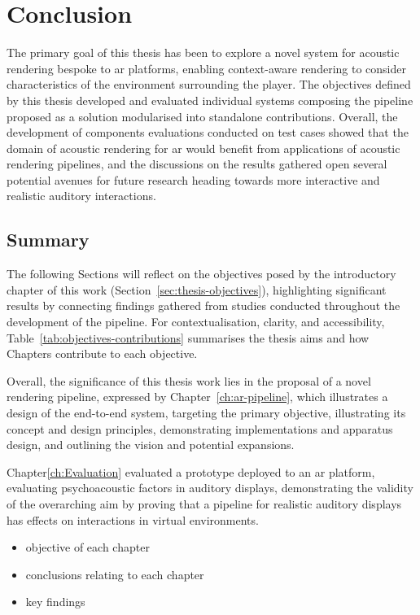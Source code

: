 \chapter{Conclusion}\label{ch:Conclusion}
The primary goal of this thesis has been to explore a novel system for acoustic rendering bespoke to \acrshort{ar} platforms, enabling context-aware rendering to consider characteristics of the environment surrounding the player. The objectives defined by this thesis developed and evaluated individual systems composing the pipeline proposed as a solution modularised into standalone contributions. Overall, the development of components evaluations conducted on test cases showed that the domain of acoustic rendering for \acrshort{ar} would benefit from applications of acoustic rendering pipelines, and the discussions on the results gathered open several potential avenues for future research heading towards more interactive and realistic auditory interactions.

\section{Summary}
The following Sections will reflect on the objectives posed by the introductory chapter of this work (Section~\ref{sec:thesis-objectives}), highlighting significant results by connecting findings gathered from studies conducted throughout the development of the pipeline. For contextualisation, clarity, and accessibility, Table~\ref{tab:objectives-contributions} summarises the thesis aims and how Chapters contribute to each objective.


Overall, the significance of this thesis work lies in the proposal of a novel rendering pipeline, expressed by Chapter~\ref{ch:ar-pipeline}, which illustrates a design of the end-to-end system, targeting the primary objective, illustrating its concept and design principles, demonstrating implementations and apparatus design, and outlining the vision and potential expansions.\par
Chapter\ref{ch:Evaluation} evaluated a prototype deployed to an \acrshort{ar} platform, evaluating psychoacoustic factors in auditory displays, demonstrating the validity of the overarching aim by proving that a pipeline for realistic auditory displays has effects on interactions in virtual environments. 

\begin{itemize}
    \item objective of each chapter
    \item conclusions relating to each chapter
    \item key findings
\end{itemize}

